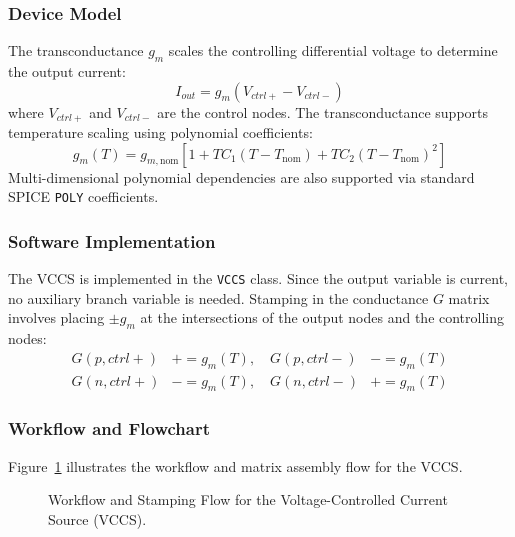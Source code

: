 \subsubsection{Device Model}
The transconductance $g_m$ scales the controlling differential voltage to determine the output current:
\begin{equation}
    I_{out} = g_m \left( V_{ctrl+} - V_{ctrl-} \right)
\end{equation}
where $V_{ctrl+}$ and $V_{ctrl-}$ are the control nodes. The transconductance supports temperature scaling using polynomial coefficients:
\begin{equation}
    g_m(T) = g_{m,\text{nom}} \left[ 1 + TC_1 (T - T_{\text{nom}}) + TC_2 (T - T_{\text{nom}})^2 \right]
\end{equation}
Multi-dimensional polynomial dependencies are also supported via standard SPICE \texttt{POLY} coefficients.

\subsubsection{Software Implementation}
The VCCS is implemented in the \texttt{VCCS} class. Since the output variable is current, no auxiliary branch variable is needed. 
Stamping in the conductance $G$ matrix involves placing $\pm g_m$ at the intersections of the output nodes and the controlling nodes:
\begin{align}
    G(p, ctrl+) &\mathrel{{+}{=}} g_m(T), \quad G(p, ctrl-) &\mathrel{{-}{=}} g_m(T) \\
    G(n, ctrl+) &\mathrel{{-}{=}} g_m(T), \quad G(n, ctrl-) &\mathrel{{+}{=}} g_m(T)
\end{align}

\subsubsection{Workflow and Flowchart}
Figure~\ref{fig:vccs_flowchart} illustrates the workflow and matrix assembly flow for the VCCS.

\begin{figure}[H]
    \centering
    \caption{Workflow and Stamping Flow for the Voltage-Controlled Current Source (VCCS).}
    \label{fig:vccs_flowchart}
\end{figure}

